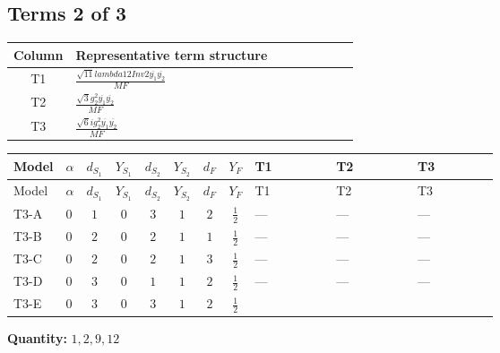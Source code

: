 \documentclass[8pt]{article}
\begin{document}
\begin{landscape}
\subsection*{Terms 2 of 3}
\begin{center}
\begin{tabular}{@{}c >{\raggedright\arraybackslash}p{0.82\linewidth}@{}}
\toprule
Column & Representative term structure \\
\midrule
T1 & \(\displaystyle \frac{\sqrt{11} lambda12Inv2 \overline{y_{1}} \overline{y_{2}}}{MF}\) \\
\midrule
T2 & \(\displaystyle \frac{\sqrt{3} g_{2}^{2} \overline{y_{1}} \overline{y_{2}}}{MF}\) \\
\midrule
T3 & \(\displaystyle \frac{\sqrt{6} i g_{2}^{2} \overline{y_{1}} \overline{y_{2}}}{MF}\) \\
\midrule
\bottomrule
\end{tabular}
\end{center}
\smallskip
\tiny
\begin{longtable}{@{}llcccccc >{\raggedright\arraybackslash}p{0.21\linewidth} >{\raggedright\arraybackslash}p{0.21\linewidth} >{\raggedright\arraybackslash}p{0.21\linewidth}@{}}
\toprule
Model & $\alpha$ & $d_{S_1}$ & $Y_{S_1}$ & $d_{S_2}$ & $Y_{S_2}$ & $d_F$ & $Y_F$ & T1 & T2 & T3 \\
\midrule
\endfirsthead
\toprule
Model & $\alpha$ & $d_{S_1}$ & $Y_{S_1}$ & $d_{S_2}$ & $Y_{S_2}$ & $d_F$ & $Y_F$ & T1 & T2 & T3 \\
\midrule
\endhead
T3-A & $0$ & $1$ & $0$ & $3$ & $1$ & $2$ & $\frac{1}{2}$ & --- & --- & --- \\
\midrule
T3-B & $0$ & $2$ & $0$ & $2$ & $1$ & $1$ & $\frac{1}{2}$ & --- & --- & --- \\
\midrule
T3-C & $0$ & $2$ & $0$ & $2$ & $1$ & $3$ & $\frac{1}{2}$ & --- & --- & --- \\
\midrule
T3-D & $0$ & $3$ & $0$ & $1$ & $1$ & $2$ & $\frac{1}{2}$ & --- & --- & --- \\
\midrule
T3-E & $0$ & $3$ & $0$ & $3$ & $1$ & $2$ & $\frac{1}{2}$ & \scriptsize\adjustbox{max width=\linewidth}{$\begin{gathered} \frac{3 \sqrt{11} lambda12Inv2 \overline{y_{1}} \overline{y_{2}}}{22 MF}\end{gathered}$} & \scriptsize\adjustbox{max width=\linewidth}{$\begin{gathered} \frac{15 \sqrt{3} g_{2}^{2} \overline{y_{1}} \overline{y_{2}}}{8 MF}\end{gathered}$} & \scriptsize\adjustbox{max width=\linewidth}{$\begin{gathered} - \frac{\sqrt{6} i g_{2}^{2} \overline{y_{1}} \overline{y_{2}}}{6 MF}\end{gathered}$} \\
\midrule
\bottomrule
\end{longtable}
\clearpage
\noindent\textbf{Quantity: }$\mathrm{1,2,9,12}$\par\smallskip

\end{landscape}
\end{document}

